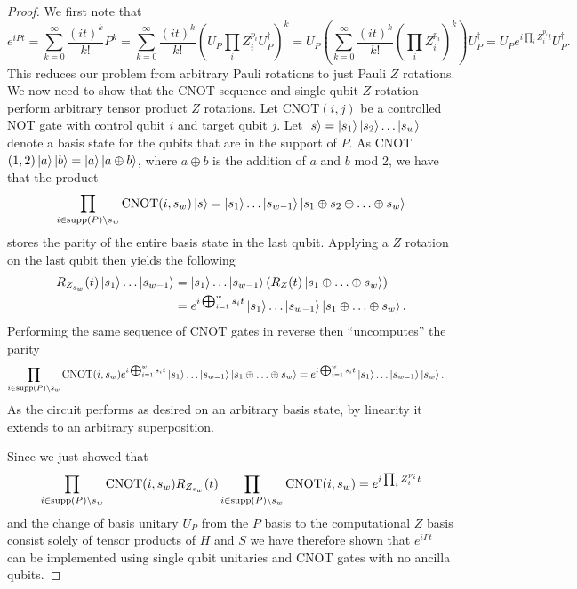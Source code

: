 \begin{proof}
    We first note that 
    \begin{equation}
        e^{i P t} = \sum_{k = 0}^\infty \frac{(i t)^k}{k!} P^k = \sum_{k = 0}^\infty \frac{(i t)^k}{k!} (U_P \prod_i Z_i^{p_i} U_P^\dagger)^k = U_P \left(\sum_{k = 0}^\infty \frac{(i t)^k}{k!} ( \prod_i Z_i^{p_i})^k \right) U_P^\dagger = U_P e^{i \prod_i Z_i^{p_i} t} U_P^\dagger.
    \end{equation}
    This reduces our problem from arbitrary Pauli rotations to just Pauli $Z$ rotations. We now need to show that the CNOT sequence and single qubit $Z$ rotation perform arbitrary tensor product $Z$ rotations. Let CNOT$(i,j)$ be a controlled NOT gate with control qubit $i$ and target qubit $j$. Let $\ket{s} = \ket{s_1} \ket{s_2} \ldots \ket{s_w}$ denote a basis state for the qubits that are in the support of $P$. As CNOT$(1,2) \ket{a}\ket{b} = \ket{a} \ket{a \oplus b}$, where $a \oplus b$ is the addition of $a$ and $b$ mod 2, we have that the product
    \begin{equation}
        \prod_{i \in {\rm supp}(P) \setminus s_w} {\rm CNOT}(i, s_w) \ket{s} = \ket{s_1} \ldots \ket{s_{w-1}} \ket{s_1 \oplus s_2 \oplus \ldots \oplus s_w}
    \end{equation}
    stores the parity of the entire basis state in the last qubit. Applying a $Z$ rotation on the last qubit then yields the following
    \begin{align}
        R_{Z_{s_w}}(t) \ket{s_1} \ldots \ket{s_{w-1}} &= \ket{s_1} \ldots \ket{s_{w- 1}} \left(R_Z(t) \ket{s_1 \oplus \ldots \oplus s_w} \right) \\
        &= e^{i \bigoplus_{i = 1}^w s_i t} \ket{s_1} \ldots \ket{s_{w- 1}} \ket{s_1 \oplus \ldots \oplus s_w}.
    \end{align}
    Performing the same sequence of CNOT gates in reverse then ``uncomputes'' the parity
    \begin{align}
        \prod_{i \in {\rm supp}(P) \setminus s_w} {\rm CNOT}(i, s_w) e^{i \bigoplus_{i = 1}^w s_i t} \ket{s_1} \ldots \ket{s_{w- 1}} \ket{s_1 \oplus \ldots \oplus s_w} &= e^{i \bigoplus_{i = 1}^w s_i t} \ket{s_1} \ldots \ket{s_{w- 1}} \ket{s_w}.
    \end{align}
    As the circuit performs as desired on an arbitrary basis state, by linearity it extends to an arbitrary superposition.

    Since we just showed that 
    \begin{equation}
    \prod_{i \in {\rm supp}(P) \setminus s_w} {\rm CNOT}(i, s_w) R_{Z_{s_w}}(t) \prod_{i \in {\rm supp}(P) \setminus s_w} {\rm CNOT}(i, s_w) = e^{i \prod_i Z_i^{p_i} t}
    \end{equation}
    and the change of basis unitary $U_P$ from the $P$ basis to the computational $Z$ basis consist solely of tensor products of $H$ and $S$ we have therefore shown that $e^{i P t}$ can be implemented using single qubit unitaries and CNOT gates with no ancilla qubits.
\end{proof}

